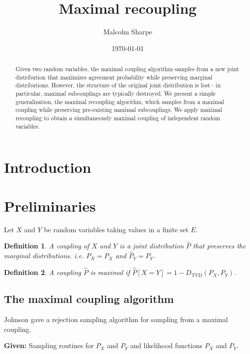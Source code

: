 \documentclass{article}
\title{Maximal recoupling}
\author{Malcolm Sharpe}
\date{\today}
\newtheorem{definition}{Definition}
\begin{document}
\maketitle
\thispagestyle{fancy}

\begin{abstract}
Given two random variables,
the maximal coupling algorithm samples from a new joint distribution that
maximizes agreement probability while preserving marginal distributions.
However, the structure of the original joint distribution is lost---in particular,
maximal subcouplings are typically destroyed.
We present a simple generalization,
the maximal recoupling algorithm,
which samples from a maximal coupling while preserving pre-existing maximal subcouplings.
We apply maximal recoupling to obtain a simultaneously maximal coupling of independent random variables.
\end{abstract}

\section*{Introduction}

\section*{Preliminaries}

Let $X$ and $Y$ be random variables taking values in a finite set $E$.

\begin{definition}
    A \textit{coupling} of $X$ and $Y$ is a joint distribution $\hat{P}$
    that preserves the marginal distributions.
    i.e. $\hat{P}_X = P_X$ and $\hat{P}_Y = P_Y$.
\end{definition}

\begin{definition}
    A coupling $\hat{P}$ is \textit{maximal} if $\hat{P}[X = Y] = 1 - D_{\text{TVD}}(P_X, P_Y)$.
\end{definition}

\subsection*{The maximal coupling algorithm}

Johnson \cite{johnson1998coupling} gave a rejection sampling algorithm for sampling from a maximal coupling.

\noindent\textbf{Given:} Sampling routines for \(P_X\) and \(P_Y\) and likelihood functions \(P_X\) and \(P_Y\).
\end{document}
